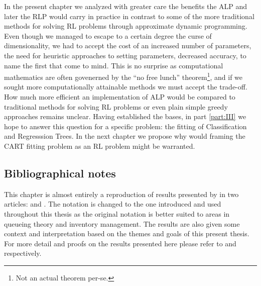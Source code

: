 In the present chapter we analyzed with greater care the benefits the ALP and
later the RLP would carry in practice in contrast to some of the more
traditional methods for solving RL problems through approximate dynamic
programming. Even though we managed to escape to a certain degree the curse of
dimensionality, we had to accept the cost of an increased number of parameters,
the need for heuristic approaches to setting parameters, decreased accuracy, to
name the first that come to mind. This is no surprise as computational
mathematics are often govenerned by the ``no free lunch'' theorem\footnote{Not
an actual theorem per-se.}, and if we sought more computationally attainable
methods we must accept the trade-off. How much more efficient an implementation
of ALP would be compared to traditional methods for solving RL problems or even
plain simple greedy approaches remains unclear. Having established the bases, in
part \ref{part:III} we hope to answer this question for a specific problem: the
fitting of Classification and Regresssion Trees. In the next chapter we propose
why would framing the CART fitting problem as an RL problem might be warranted.

\subsection{Bibliographical notes}

This chapter is almost entirely a reproduction of results presented by
\citeauthor{farias2003LP2ADP} in two articles:  and
. The notation is changed to the one introduced
and used throughout this thesis as the original notation is better suited to
areas in queueing theory and inventory management. The results are also given
some context and interpretation based on the themes and goals of this present
thesis. For more detail and proofs on the results presented here please refer to
\cite{farias2003LP2ADP} and \cite{farias2004constraint} respectively.